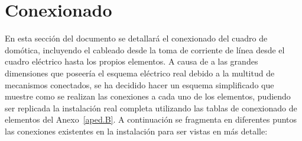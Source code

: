 \section{Conexionado}
En esta sección del documento se detallará el conexionado del cuadro de domótica, incluyendo el cableado desde la toma de corriente de línea desde el cuadro eléctrico hasta los propios elementos. A causa de a las grandes dimensiones que poseería el esquema eléctrico real debido a la multitud de mecanismos conectados, se ha decidido hacer un esquema simplificado que muestre como se realizan las conexiones a cada uno de los elementos, pudiendo ser replicada la instalación real completa utilizando las tablas de conexionado de elementos del Anexo~\ref{aped.B}. A continuación se fragmenta en diferentes puntos las conexiones existentes en la instalación para ser vistas en más detalle:

